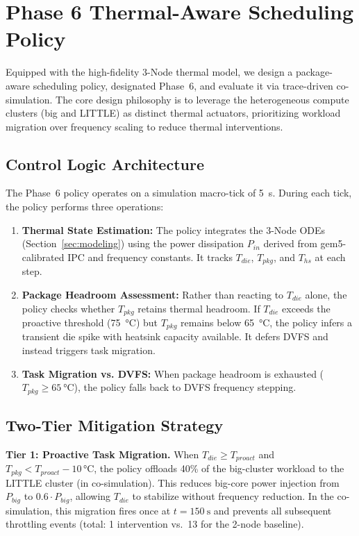 \section{Phase 6 Thermal-Aware Scheduling Policy}
\label{sec:eas}

Equipped with the high-fidelity 3-Node thermal model, we design a package-aware scheduling policy, designated Phase~6, and evaluate it via trace-driven co-simulation. The core design philosophy is to leverage the heterogeneous compute clusters (big and LITTLE) as distinct thermal actuators, prioritizing workload migration over frequency scaling to reduce thermal interventions.

\subsection{Control Logic Architecture}

The Phase~6 policy operates on a simulation macro-tick of \SI{5}{\second}. During each tick, the policy performs three operations:
\begin{enumerate}
    \item \textbf{Thermal State Estimation:} The policy integrates the 3-Node ODEs (Section~\ref{sec:modeling}) using the power dissipation $P_{in}$ derived from gem5-calibrated IPC and frequency constants. It tracks $T_{die}$, $T_{pkg}$, and $T_{hs}$ at each step.
    \item \textbf{Package Headroom Assessment:} Rather than reacting to $T_{die}$ alone, the policy checks whether $T_{pkg}$ retains thermal headroom. If $T_{die}$ exceeds the proactive threshold (\SI{75}{\degreeCelsius}) but $T_{pkg}$ remains below \SI{65}{\degreeCelsius}, the policy infers a transient die spike with heatsink capacity available. It defers DVFS and instead triggers task migration.
    \item \textbf{Task Migration vs. DVFS:} When package headroom is exhausted ($T_{pkg} \geq \SI{65}{\degreeCelsius}$), the policy falls back to DVFS frequency stepping.
\end{enumerate}

\subsection{Two-Tier Mitigation Strategy}

\textbf{Tier 1: Proactive Task Migration.}
When $T_{die} \geq T_{proact}$ and $T_{pkg} < T_{proact} - 10\,\text{°C}$, the policy offloads 40\% of the big-cluster workload to the LITTLE cluster (in co-simulation). This reduces big-core power injection from $P_{big}$ to $0.6 \cdot P_{big}$, allowing $T_{die}$ to stabilize without frequency reduction. In the co-simulation, this migration fires once at $t = \SI{150}{\second}$ and prevents all subsequent throttling events (total: 1 intervention vs.\ 13 for the 2-node baseline).

